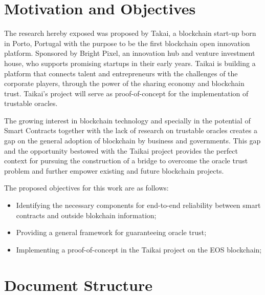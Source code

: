 \section{Motivation and Objectives} \label{sec:goals}
The research hereby exposed was proposed by Takai, a blockchain start-up born in Porto, Portugal with the purpose to be the first blockchain open innovation platform. Sponsored by Bright Pixel, an innovation hub and venture investment house, who supports promising startups in their early years. Taikai is building a platform that connects talent and entrepreneurs with the challenges of the corporate players, through the power of the sharing economy and blockchain trust. Taikai's project will serve as proof-of-concept for the implementation of trustable oracles.

The growing interest in blockchain technology and specially in the potential of Smart Contracts together with the lack of research on trustable oracles creates a gap on the general adoption of blockchain by business and governments. This gap and the opportunity bestowed with the Taikai project provides the perfect context for pursuing the construction of a bridge to overcome the oracle trust problem and further empower existing and future blockchain projects.

The proposed objectives for this work are as follows:
\begin{itemize}
\item Identifying the necessary components for end-to-end reliability between smart contracts and outside blokchain information;
\item Providing a general framework for guaranteeing oracle trust;
\item Implementing a proof-of-concept in the Taikai project on the EOS blockchain;
\end{itemize}

\section{Document Structure} \label{sec:struct}


